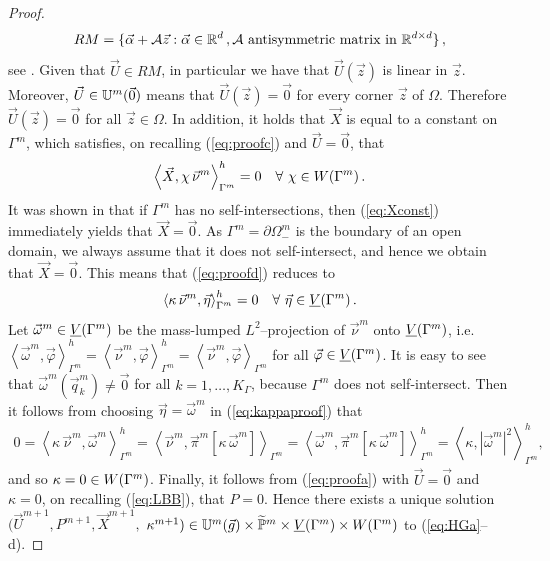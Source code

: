 \begin{proof}
\begin{equation}\label{eq:rigid_motions_space}
RM=\{\vec \alpha + \mathcal A \vec z:\vec \alpha \in \R^d\,,
\mathcal A \mbox{ antisymmetric matrix in }\R^{d\times d} \}\,,
\end{equation}
see \cite{Mardal2006}. Given that $\vec U \in RM$, in particular we have that
$\vec U(\vec z)$ is linear in $\vec z$. Moreover, $\vec U\in\uspacedisc{0}{m}$
means that $\vec U(\vec z)=\vec 0$ for every corner $\vec z$ of $\Omega$.
Therefore $\vec U(\vec z)=\vec 0$ for all $\vec z\in\Omega$. In addition, it
holds that $\vec X$ is equal to a constant on $\Gamma^m$, which
satisfies, on recalling (\ref{eq:proofc}) and $\vec U = \vec 0$, that
\begin{equation} \label{eq:Xconst}
\left\langle \vec X, \chi\,\vec\nu^m \right\rangle_{\Gamma^m}^h = 0
\quad\forall\ \chi \in \Wh\,.
\end{equation}
It was shown in \cite[Proof of Theorem~2.1]{gflows3d} that if $\Gamma^m$
has no self-intersections, then (\ref{eq:Xconst}) immediately yields that $\vec
X = \vec 0$. As $\Gamma^m = \partial\Omega^m_-$ is the boundary of an open
domain, we always assume that it does not self-intersect, and
hence we obtain that $\vec X = \vec 0$. This means that (\ref{eq:proofd})
reduces to
\begin{equation} \label{eq:kappaproof}
\left\langle \kappa\,\vec\nu^m, \vec\eta \right\rangle_{\Gamma^m}^h = 0
\quad\forall\ \vec\eta \in \Vh\,.
\end{equation}
Let $\vec\omega^m \in \Vh$ be the mass-lumped $L^2$--projection of $\vec\nu^m$
onto $\Vh$, i.e. $\left\langle \vec\omega^m, \vec\varphi
\right\rangle_{\Gamma^m}^h = \left\langle \vec\nu^m,
\vec\varphi \right\rangle_{\Gamma^m}^h = \left\langle \vec\nu^m,
\vec\varphi \right\rangle_{\Gamma^m}$ for all $\vec\varphi\in\Vh$. It is easy
to see that $\vec\omega^m (\vec q^m_k) \not= \vec 0$ for
all $k=1,\ldots,K_\Gamma$, because $\Gamma^m$ does not self-intersect.
Then it follows from choosing $\vec\eta = \vec\omega^m$ in (\ref{eq:kappaproof})
that
\begin{align*}
0 = \left\langle \kappa\,\vec\nu^m, \vec\omega^m \right\rangle_{\Gamma^m}^h
= \left\langle \vec\nu^m, \vec\pi^m[\kappa\,\vec\omega^m]
\right\rangle_{\Gamma^m}
= \left\langle \vec\omega^m,
\vec\pi^m[\kappa\,\vec\omega^m] \right\rangle_{\Gamma^m}^h
= \left\langle \kappa, |\vec\omega^m|^2 \right\rangle_{\Gamma^m}^h ,
\end{align*}
and so $\kappa = 0 \in \Wh$. Finally, it follows from (\ref{eq:proofa}) with
$\vec U = \vec 0$ and $\kappa = 0$, on recalling (\ref{eq:LBB}), that $P = 0$.
Hence there exists a unique solution $(\vec U^{m+1}, P^{m+1}, \vec X^{m+1},$
$\kappa^{m+1}) \in \uspacedisc{g}{m}\times \pnormspace^m \times \Vh \times \Wh$
to (\ref{eq:HGa}--d).
\end{proof}

